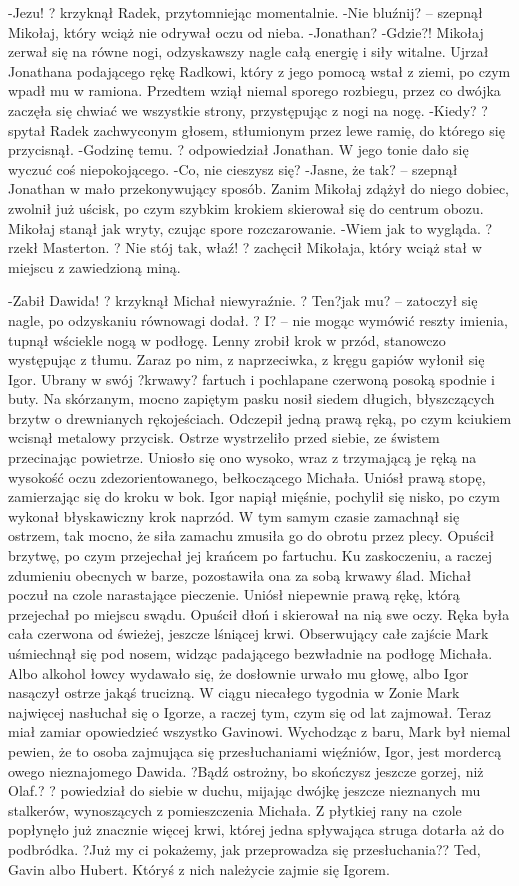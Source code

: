 \documentclass[../MAIN.tex]{subfiles}
\begin{document}
-Jezu! ? krzyknął Radek, przytomniejąc momentalnie.
-Nie bluźnij? -- szepnął Mikołaj, który wciąż nie odrywał oczu od nieba.
-Jonathan?
-Gdzie?!
Mikołaj zerwał się na równe nogi, odzyskawszy nagle całą energię i siły witalne. Ujrzał Jonathana podającego rękę Radkowi, który z jego pomocą wstał z ziemi, po czym wpadł mu w ramiona. Przedtem wziął niemal sporego rozbiegu, przez co dwójka zaczęła się chwiać we wszystkie strony, przystępując z nogi na nogę.
-Kiedy? ? spytał Radek zachwyconym głosem, stłumionym przez lewe ramię, do którego się przycisnął.
-Godzinę temu. ? odpowiedział Jonathan. W jego tonie dało się wyczuć coś niepokojącego.
-Co, nie cieszysz się?
-Jasne, że tak? -- szepnął Jonathan w mało przekonywujący sposób. Zanim Mikołaj zdążył do niego dobiec, zwolnił już uścisk, po czym szybkim krokiem skierował się do centrum obozu. Mikołaj stanął jak wryty, czując spore rozczarowanie.
-Wiem jak to wygląda. ? rzekł Masterton. ? Nie stój tak, właź! ? zachęcił Mikołaja, który wciąż stał w miejscu z zawiedzioną miną.


-Zabił Dawida! ? krzyknął Michał niewyraźnie. ? Ten?jak mu? -- zatoczył się nagle, po odzyskaniu równowagi dodał. ? I? -- nie mogąc wymówić reszty imienia, tupnął wściekle nogą w podłogę.
Lenny zrobił krok w przód, stanowczo występując z tłumu.
Zaraz po nim, z naprzeciwka, z kręgu gapiów wyłonił się Igor. Ubrany w swój ?krwawy? fartuch i pochlapane czerwoną posoką spodnie i buty. Na skórzanym, mocno zapiętym pasku nosił siedem długich, błyszczących brzytw o drewnianych rękojeściach. Odczepił jedną prawą ręką, po czym kciukiem wcisnął metalowy przycisk. Ostrze wystrzeliło przed siebie, ze świstem przecinając powietrze. Uniosło się ono wysoko, wraz z trzymającą je ręką na wysokość oczu zdezorientowanego, bełkoczącego Michała. Uniósł prawą stopę, zamierzając się do kroku w bok.
Igor napiął mięśnie, pochylił się nisko, po czym wykonał błyskawiczny krok naprzód. W tym samym czasie zamachnął się ostrzem, tak mocno, że siła zamachu zmusiła go do obrotu przez plecy.
Opuścił brzytwę, po czym przejechał jej krańcem po fartuchu. Ku zaskoczeniu, a raczej zdumieniu obecnych w barze, pozostawiła ona za sobą krwawy ślad.
Michał poczuł na czole narastające pieczenie. Uniósł niepewnie prawą rękę, którą przejechał po miejscu swądu. Opuścił dłoń i skierował na nią swe oczy.
Ręka była cała czerwona od świeżej, jeszcze lśniącej krwi.
Obserwujący całe zajście Mark uśmiechnął się pod nosem, widząc padającego bezwładnie na podłogę Michała. Albo alkohol łowcy wydawało się, że dosłownie urwało mu głowę, albo Igor nasączył ostrze jakąś trucizną.
W ciągu niecałego tygodnia w Zonie Mark najwięcej nasłuchał się o Igorze, a raczej tym, czym się od lat zajmował.
Teraz miał zamiar opowiedzieć wszystko Gavinowi. Wychodząc z baru, Mark był niemal pewien, że to osoba zajmująca się przesłuchaniami więźniów, Igor, jest mordercą owego nieznajomego Dawida.
?Bądź ostrożny, bo skończysz jeszcze gorzej, niż Olaf.? ? powiedział do siebie w duchu, mijając dwójkę jeszcze nieznanych mu stalkerów, wynoszących z pomieszczenia Michała. Z płytkiej rany na czole popłynęło już znacznie więcej krwi, której jedna spływająca struga dotarła aż do podbródka.
?Już my ci pokażemy, jak przeprowadza się przesłuchania??
Ted, Gavin albo Hubert. Któryś z nich należycie zajmie się Igorem.
\end{document}
